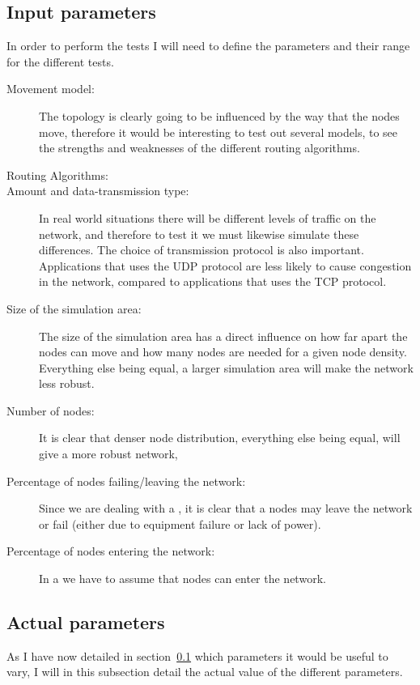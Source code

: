 \subsection{Input parameters}
\label{input_parameters}
In order to perform the tests I will need to define the parameters and their range for the different tests.
\begin{description}
\item[Movement model:] The topology is clearly going to be influenced by the way that the nodes move, therefore it would be interesting to test out several models, to see the strengths and weaknesses of the different routing algorithms.

\item[Routing Algorithms:] 

\item[Amount and data-transmission type:] In real world situations there will be different levels of traffic on the network, and therefore to test it we must likewise simulate these differences. The choice of transmission protocol is also important. Applications that uses the UDP protocol are less likely to cause congestion in the network, compared to applications that uses the TCP protocol.

\item[Size of the simulation area:] The size of the simulation area has a direct influence on how far apart the nodes can move and how many nodes are needed for a given node density. Everything else being equal, a larger simulation area will make the network less robust.

\item[Number of nodes:] It is clear that denser node distribution, everything else being equal, will give a more robust network,

\item[Percentage of nodes failing/leaving the network:] Since we are dealing with a \manet, it is clear that a nodes may leave the network or fail (either due to equipment failure or lack of power). 
\item[Percentage of nodes entering the network:] In a \manet we have to assume that nodes can enter the network.
\end{description}


\subsection{Actual parameters}
As I have now detailed in section~\ref{input_parameters} which parameters it would be useful to vary, I will in this subsection detail the actual value of the different parameters. 

